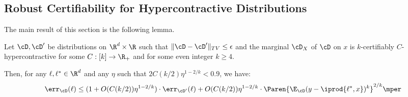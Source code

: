 \subsection{Robust Certifiability for Hypercontractive Distributions}

The main result of this section is the following lemma.
\begin{lemma}
Let $\cD,\cD'$ be distributions on $\R^d \times \R$ such that $\|\cD-\cD'\|_{TV} \leq \epsilon$ and the marginal $\cD_X$ of $\cD$ on $x$ is $k$-certifiably $C$-hypercontractive for some $C:[k] \to \R_+$ and for some even integer $k \geq 4$.

Then, for any $\ell,\ell^* \in \R^d$ and any $\eta$ such that $2 C(k/2) \eta^{1-2/k} < 0.9$, we have:
\[
\err_{\cD}(\ell) \leq (1+O(C(k/2)) \eta^{1-2/k}) \cdot \err_{\cD'}(\ell) + O(C(k/2))\eta^{1-2/k} \cdot \Paren{\E_\cD (y-\iprod{\ell^{*},x})^k}^{2/k}\mper\]
\label{lem:identifiability-least-squares-linear}

\end{lemma}
